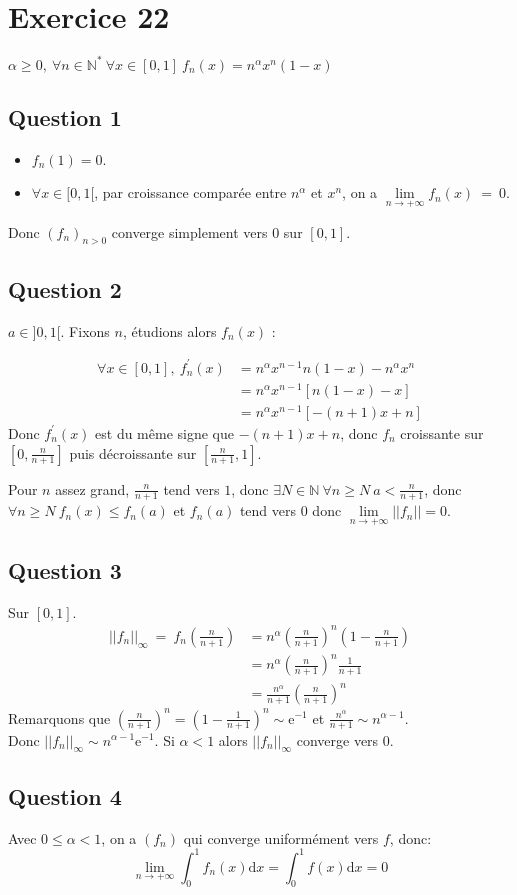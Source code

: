 \documentclass[td5.tex]{subfiles}
\begin{document}
\section{Exercice 22}
$\alpha \geq 0,~\forall n \in \mathbb{N}^*~\forall x \in [0,1]~f_n(x)=n^{\alpha}x^n(1-x)$

\subsection*{Question 1}
\begin{itemize}
\item $f_n(1) = 0$.
\item $\forall x \in [0,1[$, par croissance comparée entre $n^{\alpha}$ et $x^n$, on a $\lim\limits_{n \to +\infty}f_n(x)~=~0$.
\end{itemize}
Donc $(f_n)_{n>0}$ converge simplement vers $0$ sur $[0,1]$.

\subsection*{Question 2}
$a \in ]0,1[$. Fixons $n$, étudions alors $f_n(x)$ :

\begin{align*}
  \forall x \in [0,1],~f^{'}_{n}(x) &= n^{\alpha}x^{n-1}n(1-x)-n^{\alpha}x^n \\
                                    &= n^{\alpha}x^{n-1}\left[ n(1-x) - x \right] \\
                                    &= n^{\alpha}x^{n-1}\left[ -(n+1)x + n \right]
\end{align*}
Donc $f^{'}_{n}(x)$ est du même signe que $-(n+1)x + n$, donc $f_n$ croissante sur $[0, \frac{n}{n+1}]$ puis décroissante sur $[\frac{n}{n+1}, 1]$.

Pour $n$ assez grand, $\frac{n}{n+1}$ tend vers $1$, donc $\exists N \in \mathbb{N}~\forall n \geq N~a < \frac{n}{n+1}$, donc $\forall n \geq N~f_n(x) \leq f_n(a)$ et $f_n(a)$ tend vers $0$ donc $\lim\limits_{n \to +\infty}||f_n||=0$.

\subsection*{Question 3}
Sur $[0,1]$.
\begin{align*}
  ||f_n||_{\infty}~=~f_n\left(\frac{n}{n+1}\right) &= n^{\alpha} \left(\frac{n}{n+1}\right)^n \left(1-\frac{n}{n+1}\right)\\
                                        &= n^{\alpha} \left(\frac{n}{n+1}\right)^n \frac{1}{n+1}\\
                                        &= \frac{n^{\alpha}}{n+1} \left(\frac{n}{n+1}\right)^n 
\end{align*}
Remarquons que $\left(\frac{n}{n+1}\right)^n = \left(1-\frac{1}{n+1}\right)^n \sim \mathrm{e}^{-1}$ et $\frac{n^{\alpha}}{n+1} \sim n^{\alpha-1}$.
\\Donc $||f_n||_{\infty} \sim n^{\alpha-1}\mathrm{e}^{-1}$. Si $\alpha < 1$ alors $||f_n||_{\infty}$ converge vers $0$.

\subsection*{Question 4}
Avec $0 \leq \alpha < 1$, on a $(f_n)$ qui converge uniformément vers $f$, donc:
\[
  \lim\limits_{n \to +\infty}\int_0^1 f_n(x)\mathrm{d}x=\int_0^1 f(x)\mathrm{d}x=0
\]
\end{document}
